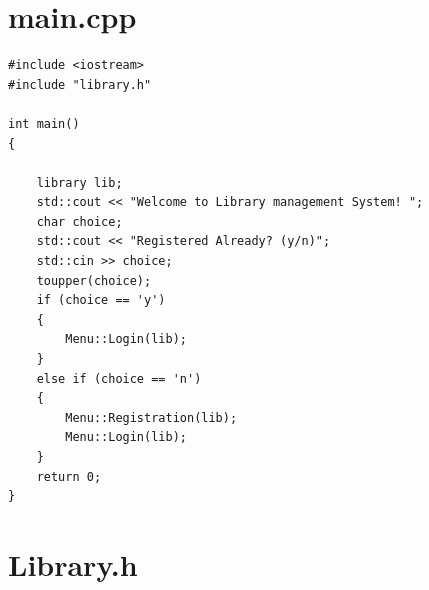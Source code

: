 \documentclass[12pt,a4paper]{report}
\begin{document}
\chapter{main.cpp}
\begin{verbatim}
#include <iostream>
#include "library.h"

int main()
{

    library lib;
    std::cout << "Welcome to Library management System! ";
    char choice;
    std::cout << "Registered Already? (y/n)";
    std::cin >> choice;
    toupper(choice);
    if (choice == 'y')
    {
        Menu::Login(lib);
    }
    else if (choice == 'n')
    {
        Menu::Registration(lib);
        Menu::Login(lib);
    }
    return 0;
}
\end{verbatim}

\chapter{Library.h}
\end{document}
